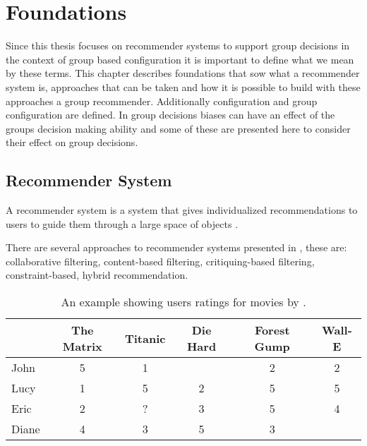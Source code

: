 \chapter{Foundations}
\label{ch:Foundations}

Since this thesis focuses on recommender systems to support group decisions in the context of group based configuration it is important to define what we mean by these terms. This chapter describes foundations that sow what a recommender system is, approaches that can be taken and how it is possible to build with these approaches a group recommender. Additionally configuration and group configuration are defined. In group decisions biases can have an effect of the groups decision making ability and some of these are presented here to consider their effect on group decisions. 

\section{Recommender System}
\label{sec:Foundations:RecommenderSystem}

A recommender system is a system that gives individualized recommendations to users to guide them through a large space of objects \cite[~ p. 331]{burkeHybridRecommenderSystems2002}.

There are several approaches to recommender systems presented in \cite{felfernigGroupRecommenderSystems2018}, these are: collaborative filtering, content-based filtering, critiquing-based filtering, constraint-based, hybrid recommendation.

\begin{table}
    \centering    
    \begin{tabular}{ l | c | c | c | c | c }
        & The Matrix & Titanic & Die Hard & Forest Gump & Wall-E \\ \hline
         John  & 5 & 1 &   & 2 & 2 \\
         Lucy  & 1 & 5 & 2 & 5 & 5 \\
         Eric  & 2 & ? & 3 & 5 & 4 \\
         Diane & 4 & 3 & 5 & 3 &   \\
    \end{tabular}
    \caption{An example showing users ratings for movies by \citeauthor{ningComprehensiveSurveyNeighborhoodBased2015} \cite{ningComprehensiveSurveyNeighborhoodBased2015}.}
    
    \label{tab:Foundations:RecommenderSystem:MoviePreferences}
\end{table}

